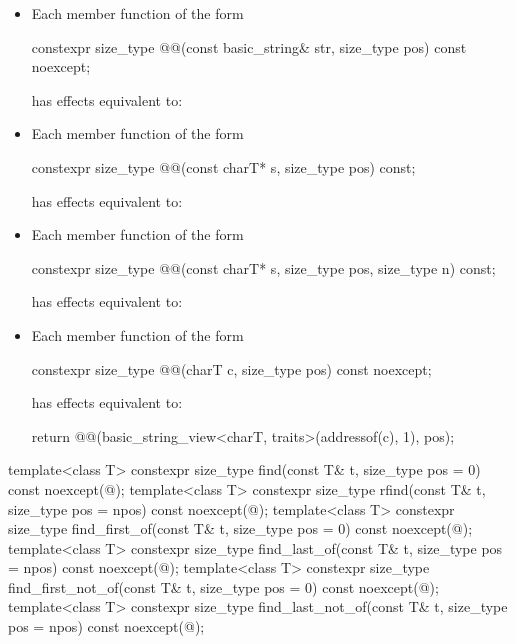 \begin{itemize}
\item
Each member function of the form
\begin{codeblock}
constexpr size_type @@(const basic_string& str, size_type pos) const noexcept;
\end{codeblock}
has effects equivalent to:

\item
Each member function of the form
\begin{codeblock}
constexpr size_type @@(const charT* s, size_type pos) const;
\end{codeblock}
has effects equivalent to:

\item
Each member function of the form
\begin{codeblock}
constexpr size_type @@(const charT* s, size_type pos, size_type n) const;
\end{codeblock}
has effects equivalent to:

\item
Each member function of the form
\begin{codeblock}
constexpr size_type @@(charT c, size_type pos) const noexcept;
\end{codeblock}
has effects equivalent to:
\begin{codeblock}
return @@(basic_string_view<charT, traits>(addressof(c), 1), pos);
\end{codeblock}
\end{itemize}

%
%
%
%
%
%
\begin{itemdecl}
template<class T>
  constexpr size_type find(const T& t, size_type pos = 0) const noexcept(@\seebelow@);
template<class T>
  constexpr size_type rfind(const T& t, size_type pos = npos) const noexcept(@\seebelow@);
template<class T>
  constexpr size_type find_first_of(const T& t, size_type pos = 0) const noexcept(@\seebelow@);
template<class T>
  constexpr size_type find_last_of(const T& t, size_type pos = npos) const noexcept(@\seebelow@);
template<class T>
  constexpr size_type find_first_not_of(const T& t, size_type pos = 0) const noexcept(@\seebelow@);
template<class T>
  constexpr size_type find_last_not_of(const T& t, size_type pos = npos) const noexcept(@\seebelow@);
\end{itemdecl}

